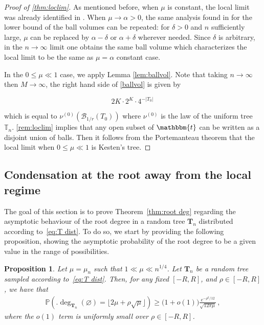 \documentclass{article}
\newcommand{\pr}{\mathbb{P}}								%
\newcommand{\Prob}[1]{\pr\left(#1\right)}					%
\newcommand{\1}{\mathbbm{1}}								%
\newtheorem{proposition}[theorem]{Proposition}
\theoremstyle{definition}
\numberwithin{equation}{section}
\newcommand{\T}{\mathbb T}
\begin{document}
\begin{proof}[Proof of \cref{thm:loclim}]
As mentioned before, when $\mu$ is constant, the local limit was already identified in \cite{durhuus2023trees}. When $\mu \to \alpha>0$, the same analysis found in \cite[Lemma 4.2]{durhuus2023trees} for the lower bound of the ball volumes can be repeated: for $\delta>0$ and $n$ sufficiently large, $\mu$ can be replaced by $\alpha-\delta$ or $\alpha+\delta$ wherever needed. Since $\delta$ is arbitrary, in the $n \to \infty$ limit one obtains the same ball volume which characterizes the local limit to be the same as $\mu = \alpha$ constant case.

In the $0\leq \mu \ll 1$ case, we apply Lemma \ref{lem:ballvol}. Note that taking $n \rightarrow \infty$ then $M \rightarrow \infty$, the right hand side of \eqref{ballvol} is given by

$$
2 K \cdot 2^K \cdot 4^{-|T_0|} \, 
$$

which is equal to $\nu^{(0)}(\mathcal{B}_{1/r}(T_0))$ where $\nu^{(0)}$ is the law of the uniform {tree $\T_n$}. \cref{rem:loclim} implies that any open subset of $\mathbbm{t}$ can be written as a disjoint union of balls. Then it follows from the Portemanteau theorem that the local limit when $0 \leq \mu \ll 1$ is Kesten's tree.

\end{proof}

\subsection{Condensation at the root away from the local regime}\label{sec:root deg}

The goal of this section is to prove Theorem~\ref{thm:root deg} regarding the asymptotic behaviour of the root degree in a random tree $\mathbf{T}_n$ distributed according to~\eqref{eq:T dist}.
To do so, we start by providing the following proposition, showing the asymptotic probability of the root degree to be a given value in the range of possibilities.

\begin{proposition}\label{prop:root degree}
    Let $\mu=\mu_n$ such that $1\ll\mu\ll n^{1/4}$.
    Let $\mathbf{T}_n$ be a random tree sampled according to~\eqref{eq:T dist}.
    Then, for any fixed $[-R,R]$, and $\rho\in [-R,R]$, we have that
    \begin{align*}
\Prob{\Big.\deg_{\mathbf{T}_n}(\varnothing)=\lfloor2\mu+\rho\sqrt{\mu}\rfloor}\geq\big(1+o(1)\big)\frac{e^{-\rho^2/12}}{\sqrt{12\pi\mu}}\,,
    \end{align*}
    where the $o(1)$ term is uniformly small over $\rho \in [-R,R]$.
\end{proposition}
\end{document}
